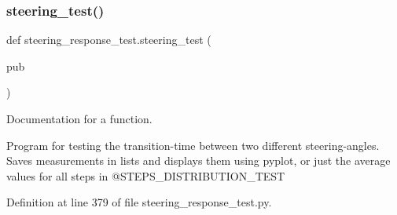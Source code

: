 \subsubsection{\texorpdfstring{steering\_test()}{steering\_test()}}
{\footnotesize\ttfamily def steering\+\_\+response\+\_\+test.\+steering\+\_\+test (\begin{DoxyParamCaption}\item[{}]{pub }\end{DoxyParamCaption})}



Documentation for a function. 

Program for testing the transition-\/time between two different steering-\/angles. Saves measurements in lists and displays them using pyplot, or just the average values for all steps in @\+S\+T\+E\+P\+S\+\_\+\+D\+I\+S\+T\+R\+I\+B\+U\+T\+I\+O\+N\+\_\+\+T\+E\+ST 

Definition at line 379 of file steering\+\_\+response\+\_\+test.\+py.



